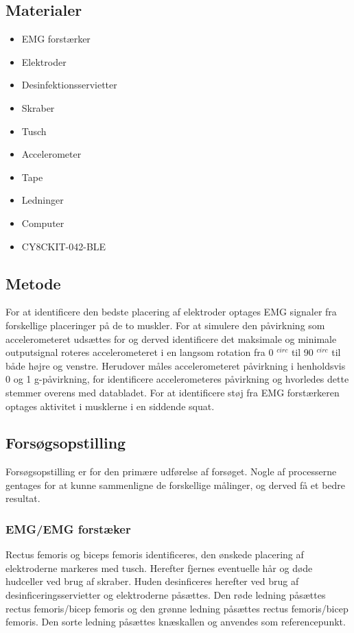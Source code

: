 \subsection{Materialer}  
\begin{itemize}
\item EMG forstærker
\item Elektroder
\item Desinfektionsservietter
\item Skraber
\item Tusch 

\item Accelerometer
\item Tape
\item Ledninger

\item Computer
\item CY8CKIT-042-BLE
\end{itemize}

\subsection{Metode}

For at identificere den bedste placering af elektroder optages EMG signaler fra forskellige placeringer på de to muskler. 
For at simulere den påvirkning som accelerometeret udsættes for og derved identificere det maksimale og minimale outputsignal roteres accelerometeret i en langsom rotation fra 0 $^{circ}$ til 90 $^{circ}$  til både højre og venstre. Herudover måles accelerometeret påvirkning i henholdsvis 0 og 1 g-påvirkning, for identificere accelerometeres påvirkning og hvorledes dette stemmer overens med databladet. 
For at identificere støj fra EMG forstærkeren optages aktivitet i musklerne i en siddende squat.
 

\subsection{Forsøgsopstilling}
Forsøgsopstilling er for den primære udførelse af forsøget. Nogle af processerne gentages for at kunne sammenligne de forskellige målinger, og derved få et bedre resultat.

\subsubsection{EMG/EMG forstæker}
Rectus femoris og biceps femoris identificeres, den ønskede placering af elektroderne markeres med tusch. Herefter fjernes eventuelle hår og døde hudceller ved brug af skraber. Huden desinficeres herefter ved brug af desinficeringsservietter og elektroderne påsættes. Den røde ledning påsættes rectus femoris/bicep femoris og den grønne ledning påsættes rectus femoris/bicep femoris. Den sorte ledning påsættes knæskallen og anvendes som referencepunkt.

